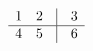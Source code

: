 \documentclass{article}
\begin{document}
    $$
    \begin{array}{cc@{\kern 10pt}|@{\kern 10pt}c}
        1 & 2 & 3 \\
        \hline
        4 & 5 & 6
    \end{array}
    $$
\end{document}
